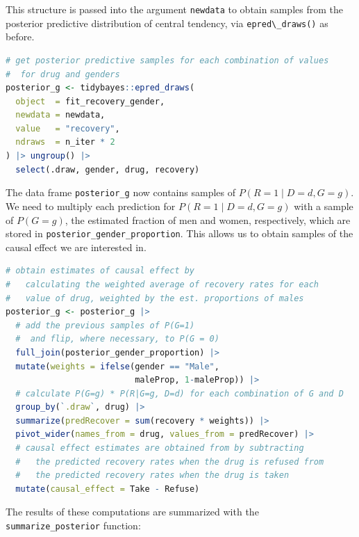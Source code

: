 \documentclass[nobib]{tufte-handout}
\newcommand{\ri}[1]{\mbox{\lstinline{#1}}\xspace}  %
\begin{document}
\vspace{-0.5cm}
This structure is passed into the argument \ri{newdata} to obtain samples from the posterior predictive distribution of central tendency, via \ri{epred\_draws()} as before.

\begin{minipage}[]{\textwidth}
\begin{lstlisting}[language=R]
# get posterior predictive samples for each combination of values
#  for drug and genders
posterior_g <- tidybayes::epred_draws(
  object  = fit_recovery_gender,
  newdata = newdata,
  value   = "recovery",
  ndraws  = n_iter * 2
) |> ungroup() |>
  select(.draw, gender, drug, recovery)
\end{lstlisting}
\end{minipage}

\vspace{-0.5cm}
The data frame \ri{posterior_g} now contains samples of $P(R=1 \mid D=d, G=g)$.
We need to multiply each prediction for $P(R=1 \mid D=d, G=g)$ with a sample of $P(G=g)$, the estimated fraction of men and women, respectively, which are stored in \ri{posterior_gender_proportion}.
This allows us to obtain samples of the causal effect we are interested in.

\begin{minipage}[]{\textwidth}
\begin{lstlisting}[language=R]
# obtain estimates of causal effect by
#   calculating the weighted average of recovery rates for each
#   value of drug, weighted by the est. proportions of males
posterior_g <- posterior_g |>
  # add the previous samples of P(G=1)
  #  and flip, where necessary, to P(G = 0)
  full_join(posterior_gender_proportion) |>
  mutate(weights = ifelse(gender == "Male",
                          maleProp, 1-maleProp)) |>
  # calculate P(G=g) * P(R|G=g, D=d) for each combination of G and D
  group_by(`.draw`, drug) |>
  summarize(predRecover = sum(recovery * weights)) |>
  pivot_wider(names_from = drug, values_from = predRecover) |>
  # causal effect estimates are obtained from by subtracting
  #   the predicted recovery rates when the drug is refused from
  #   the predicted recovery rates when the drug is taken
  mutate(causal_effect = Take - Refuse)
\end{lstlisting}
\end{minipage}

\vspace{-0.5cm}
The results of these computations are summarized with the \ri{summarize_posterior} function:
\end{document}
